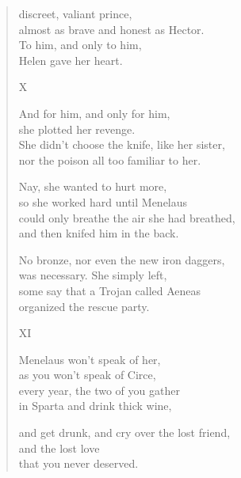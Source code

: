 \documentclass[11pt,a4paper]{article}
\begin{document}
\begin{verse}
discreet, valiant prince,\\
almost as brave and honest as Hector.\\
To him, and only to him,\\
Helen gave her heart.

X

And for him, and only for him,\\
she plotted her revenge.\\
She didn't choose the knife, like her sister,\\
nor the poison all too familiar to her.

Nay, she wanted to hurt more,\\
so she worked hard until Menelaus\\
could only breathe the air she had breathed,\\
and then knifed him in the back.

No bronze, nor even the new iron daggers,\\
was necessary. She simply left,\\
some say that a Trojan called Aeneas\\
organized the rescue party.

XI

Menelaus won't speak of her,\\
as you won't speak of Circe,\\
every year, the two of you gather\\
in Sparta and drink thick wine,

and get drunk, and cry over the lost friend,\\
and the lost love\\
that you never deserved.
\end{verse}
\end{document}
